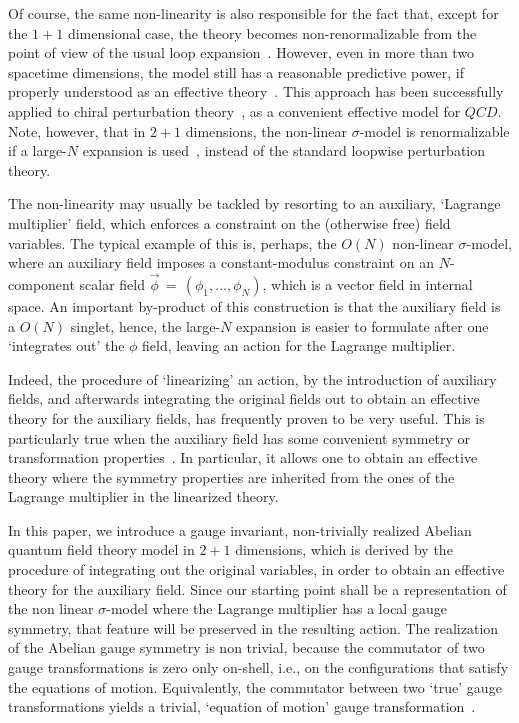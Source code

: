 \documentclass[a4paper,12pt]{article}
\begin{document}
Of course, the same non-linearity is also responsible for the fact
that, except for the $1+1$ dimensional case, the theory becomes
non-renormalizable from the point of view of the usual loop
expansion~\cite{zinn}.  However, even in more than two spacetime
dimensions, the model still has a reasonable predictive power, if
properly understood as an effective theory~\cite{weinberg2}.  This
approach has been successfully applied to chiral perturbation
theory~\cite{cpt}, as a convenient effective model for $QCD$.  Note,
however, that in $2+1$ dimensions, the non-linear $\sigma$-model is
renormalizable if a large-$N$ expansion is used~\cite{largen}, instead
of the standard loopwise perturbation theory.

The non-linearity may usually be tackled by resorting to an auxiliary,
`Lagrange multiplier' field, which enforces a constraint on the
(otherwise free) field variables. The typical example of this is,
perhaps, the $O(N)$ non-linear $\sigma$-model, where an auxiliary
field imposes a constant-modulus constraint on an $N$-component scalar
field ${\vec \phi}\,=\,(\phi_1,\ldots,\phi_N)$, which is a vector
field in internal space.  An important by-product of this construction
is that the auxiliary field is a $O(N)$ singlet, hence, the large-$N$
expansion is easier to formulate after one `integrates out' the $\phi$
field, leaving an action for the Lagrange multiplier.

Indeed, the procedure of `linearizing' an action, by the introduction
of auxiliary fields, and afterwards integrating the original fields
out to obtain an effective theory for the auxiliary fields, has
frequently proven to be very useful. This is particularly true when
the auxiliary field has some convenient symmetry or transformation
properties~\cite{rivers}.  In particular, it allows one to obtain an
effective theory where the symmetry properties are inherited from the
ones of the Lagrange multiplier in the linearized theory.


In this paper, we introduce a gauge invariant, non-trivially realized
Abelian quantum field theory model in $2+1$ dimensions, which is
derived by the procedure of integrating out the original variables, in
order to obtain an effective theory for the auxiliary field. Since our
starting point shall be a representation of the non linear
$\sigma$-model where the Lagrange multiplier has a local gauge
symmetry, that feature will be preserved in the resulting action.  The
realization of the Abelian gauge symmetry is non trivial, because the
commutator of two gauge transformations is zero only on-shell, i.e.,
on the configurations that satisfy the equations of motion.
Equivalently, the commutator between two `true' gauge transformations
yields a trivial, `equation of motion' gauge
transformation~\cite{deWit:1978cd,teit}.
\end{document}
